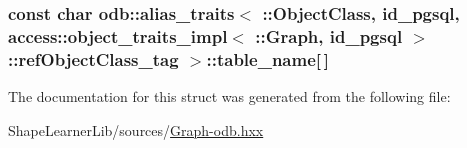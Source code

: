 \subsubsection[{table\+\_\+name}]{\setlength{\rightskip}{0pt plus 5cm}const char odb\+::alias\+\_\+traits$<$ \+::{\bf Object\+Class}, id\+\_\+pgsql, access\+::object\+\_\+traits\+\_\+impl$<$ \+::{\bf Graph}, id\+\_\+pgsql $>$\+::ref\+Object\+Class\+\_\+tag $>$\+::table\+\_\+name\mbox{[}$\,$\mbox{]}\hspace{0.3cm}{\ttfamily [static]}}\label{structodb_1_1alias__traits_3_01_1_1_object_class_00_01id__pgsql_00_01access_1_1object__traits__i1ebaecaa53ca957735d3ecda1964730f_a3e4c6e2b39cc4be1624d5c239228a87b}


The documentation for this struct was generated from the following file\+:\begin{DoxyCompactItemize}
\item 
Shape\+Learner\+Lib/sources/\hyperlink{_graph-odb_8hxx}{Graph-\/odb.\+hxx}\end{DoxyCompactItemize}
